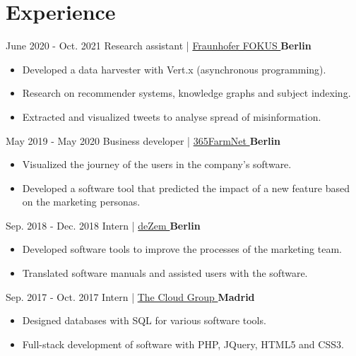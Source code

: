 \documentclass[]{commands}
\begin{document}
\section{Experience}
\begin{entrylist}
  \entry
    {June 2020 - Oct. 2021}
    {Research assistant | }
    { \href{https://www.fokus.fraunhofer.de/}{\small Fraunhofer FOKUS \faMousePointer}}
    {\normalsize\textbf{\color{ipsgreen}\faMapMarker\space Berlin}}
    {\jobspace
    \begin{itemize}[leftmargin=*, itemsep = 0.1em]
        \item Developed a data harvester with Vert.x (asynchronous programming).
        \item Research on recommender systems, knowledge graphs and subject indexing.
        \item Extracted and visualized tweets to analyse spread of misinformation.\\
    \end{itemize}}

  \entry
    {May 2019 - May 2020}
    {Business developer | }
    { \href{https://www.365farmnet.com/en/}{\small 365FarmNet \faMousePointer}}
    {\normalsize\textbf{\color{ipsgreen}\faMapMarker\space Berlin}}
    {\jobspace
    \begin{itemize}[leftmargin=*, itemsep = 0.1em]
        \item Visualized the journey of the users in the company's software.
        \item Developed a software tool that predicted the impact of a new feature based on the marketing personas. \\
    \end{itemize}}
    
  \entry
    {Sep. 2018 - Dec. 2018}
    {Intern | }
    { \href{https://www.dezem.de/en/}{\small deZem \faMousePointer}}
    {\normalsize\textbf{\color{ipsgreen}\faMapMarker\space Berlin}}
    {\jobspace
    \begin{itemize}[leftmargin=*, itemsep = 0.1em]
        \item Developed software tools to improve the processes of the marketing team.
        \item Translated software manuals and assisted users with the software. \\
    \end{itemize}}
    
  \entry
    {Sep. 2017 - Oct. 2017}
    {Intern | }
    { \href{https://thecloud.group/}{\small The Cloud Group \faMousePointer}}
    {\normalsize\textbf{\color{ipsgreen}\faMapMarker\space Madrid}}
    {\jobspace
    \begin{itemize}[leftmargin=*, itemsep = 0.1em]
        \item Designed databases with SQL for various software tools. 
        \item Full-stack development of software with PHP, JQuery, HTML5 and CSS3. \\
    \end{itemize}}
    

\end{entrylist}
\end{document}
